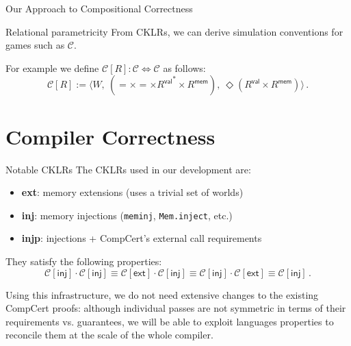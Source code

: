 \documentclass{beamer}
\newcommand{\kw}[1]{\ensuremath{ \mathsf{#1} }}
\begin{document}
\begin{frame}{Our Approach to Compositional Correctness}
\begin{frame}{Relational parametricity}
From CKLRs, we can derive simulation conventions
for games such as $\mathcal{C}$.

\vspace{1em}
For example
we define $\mathcal{C}[R] : \mathcal{C} \Leftrightarrow \mathcal{C}$
as follows:
\[
    \mathcal{C}[R] := \langle
      W, \:
      ({=} \times {=} \times {R^\kw{val}}^* \times R^\kw{mem}), \:
      \Diamond (R^\kw{val} \times R^\kw{mem})
    \rangle \,.
\]
\end{frame}

\section{Compiler Correctness}

\begin{frame}{Notable CKLRs}
The CKLRs used in our development are:
\begin{itemize}
  \item \textbf{ext}: memory extensions (uses a trivial set of worlds)
  \item \textbf{inj}: memory injections (\texttt{meminj},
    \texttt{Mem.inject}, etc.)
  \item \textbf{injp}: injections + CompCert's external call requirements
\end{itemize}

\vspace{1ex}
They satisfy the following properties:
\[
  \mathcal{C}[\kw{inj}] \cdot \mathcal{C}[\kw{inj}] \equiv
  \mathcal{C}[\kw{ext}] \cdot \mathcal{C}[\kw{inj}] \equiv
  \mathcal{C}[\kw{inj}] \cdot \mathcal{C}[\kw{ext}] \equiv
  \mathcal{C}[\kw{inj}] \,.
\]

Using this infrastructure,
we do not need extensive changes to the existing CompCert proofs:
although individual passes are not symmetric in terms of their
requirements vs. guarantees,
we will be able to exploit languages properties
to reconcile them at the scale of the whole compiler.
\end{frame}


\end{frame}
\end{document}
